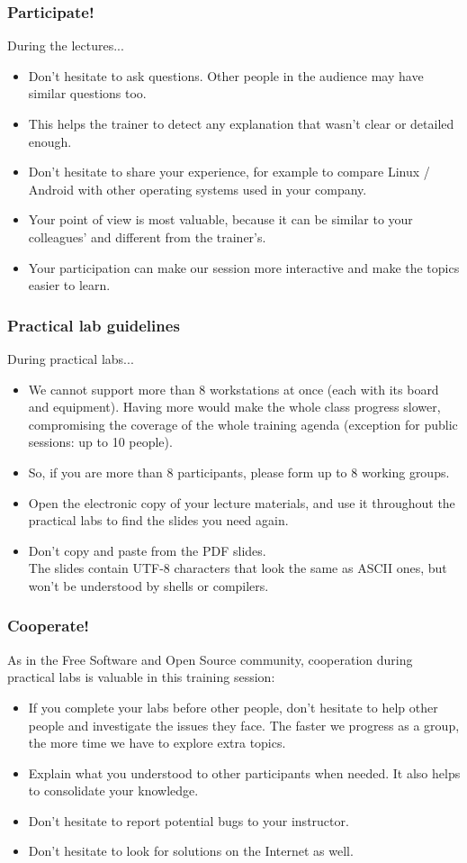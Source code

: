 \begin{frame}
\frametitle{Participate!}
During the lectures...
\begin{itemize}
\item Don't hesitate to ask questions. Other people in the audience may have
similar questions too.
\item This helps the trainer to detect any explanation that wasn't clear or
detailed enough.
\item Don't hesitate to share your experience, for example to compare Linux
/ Android with other operating systems used in your company.
\item Your point of view is most valuable, because it can be similar to your
colleagues' and different from the trainer's.
\item Your participation can make our session more interactive and make the
topics easier to learn.
\end{itemize}
\end{frame}

\begin{frame}
\frametitle{Practical lab guidelines}
During practical labs...
\begin{itemize}
\item We cannot support more than 8 workstations at once (each with its board
and equipment). Having more would make the whole class progress slower,
compromising the coverage of the whole training agenda (exception for public
sessions: up to 10 people).
\item So, if you are more than 8 participants, please form up to 8 working
groups.
\item Open the electronic copy of your lecture materials, and use it throughout
the practical labs to find the slides you need again.
\item Don't copy and paste from the PDF slides.\\
The slides contain UTF-8 characters that look the same as ASCII ones, but won't
be understood by shells or compilers.
\end{itemize}
\end{frame}

\begin{frame}
\frametitle{Cooperate!}
As in the Free Software and Open Source community,
cooperation during practical labs is valuable in this training session:
\begin{itemize}
\item If you complete your labs before other people, don't hesitate to help
other people and investigate the issues they face. The faster we progress as a
group, the more time we have to explore extra topics.
\item Explain what you understood to other participants when needed.
It also helps to consolidate your knowledge.
\item Don't hesitate to report potential bugs to your instructor.
\item Don't hesitate to look for solutions on the Internet as well.
\end{itemize}
\end{frame}

